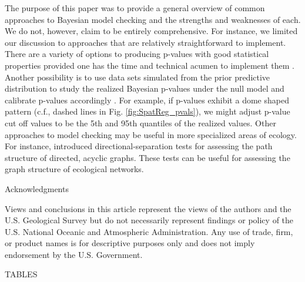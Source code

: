 \documentclass[12pt,english]{article}
\begin{document}
\begin{spacing}{1.9}
    The purpose of this paper was to provide a general overview of
    common approaches to Bayesian model checking and the strengths and
    weaknesses of each.  We do not, however, claim to be entirely
    comprehensive. For instance, we limited our discussion to
    approaches that are relatively straightforward to implement.
    There are a variety of options to producing p-values with good
    statistical properties provided one has the time and technical
    acumen to implement them \citep[e.g., ``partial posterior" and
    ``conditional predictive" p-values;
    see][]{BayarriBerger1999,RobinsEtAl2000,BayarriCastellanos2007}. Another
    possibility is to use data sets simulated from the prior
    predictive distribution to study the realized Bayesian p-values
    under the null model and calibrate p-values accordingly
    \citep{HjortEtAl2006}.  For example, if p-values exhibit a dome
    shaped pattern (c.f., dashed lines in
    Fig. \ref{fig:SpatReg_pvals}), we might adjust p-value cut off
    values to be the 5th and 95th quantiles of the realized values.
    Other approaches to model checking may be useful in more
    specialized areas of ecology.  For instance, \citet{Shipley2009}
    introduced directional-separation tests for assessing the path
    structure of directed, acyclic graphs.  These tests can be useful
    for assessing the graph structure of ecological networks.


    \centerline{\sc Acknowledgments} Views and conclusions in this
    article represent the views of the authors and the U.S. Geological
    Survey but do not necessarily represent findings or policy of the
    U.S. National Oceanic and Atmospheric Administration.  Any use of
    trade, firm, or product names is for descriptive purposes only and
    does not imply endorsement by the U.S. Government.

    \renewcommand{\refname}{Literature Cited}
    



    \pagebreak




    TABLES


\end{spacing}
\end{document}
